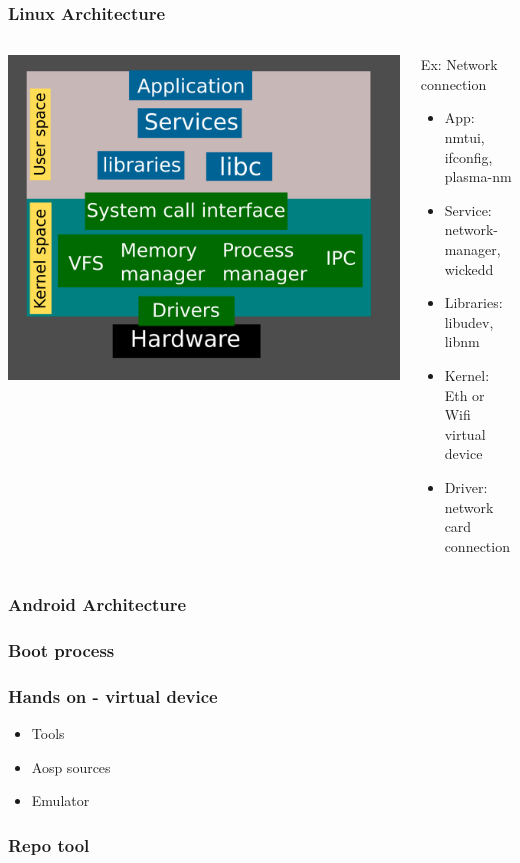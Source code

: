 \documentclass{beamer}
\begin{document}
\begin{frame}
  \frametitle{Linux Architecture}
  \begin{columns}
    \includegraphics[width=\textwidth,height=\textheight,keepaspectratio]{./media/linux_arch.png}
    \begin{block}{Ex: Network connection}
      \begin{itemize}
      \item{App: nmtui, ifconfig, plasma-nm}
      \item{Service: network-manager, wickedd}
      \item{Libraries: libudev, libnm}
      \item{Kernel: Eth or Wifi virtual device}
      \item{Driver: network card connection}
      \end{itemize}
    \end{block}
  \end{columns}
\end{frame}

\begin{frame}
  \frametitle{Android Architecture}
\end{frame}

\begin{frame}
  \frametitle{Boot process}
\end{frame}

\begin{frame}
  \frametitle{Hands on - virtual device}
  \begin{itemize}
  \item{Tools}
  \item{Aosp sources}
  \item{Emulator}
  \end{itemize}
\end{frame}

\begin{frame}
  \frametitle{Repo tool}
\end{frame}


    
  
\end{document}
